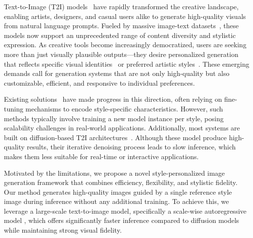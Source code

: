 \documentclass[10pt,twocolumn,letterpaper]{article}
\begin{document}
Text-to-Image (T2I) models~\cite{ramesh2021zero, rombach2022high, saharia2022photorealistic, podell2023sdxl, chang2023muse, han2025infinity, tang2024hartefficientvisualgeneration} have rapidly transformed the creative landscape, enabling artists, designers, and casual users alike to generate high-quality visuals from natural language prompts. Fueled by massive image-text datasets~\cite{changpinyo2021conceptual, lin2014microsoft, schuhmann2022laion, kakaobrain2022coyo-700m}, these models now support an unprecedented range of content diversity and stylistic expression.
As creative tools become increasingly democratized, users are seeking more than just visually plausible outputs—they desire personalized generation that reflects specific visual identities~\cite{ruiz2023dreambooth, li2023blip, wei2023elite, ryu2023low, li2024photomaker} or preferred artistic styles~\cite{sohn2023styledrop, hertz2024stylealignedimagegeneration, liu2024unziplora, ryu2023low, zhang2024finestyle}. These emerging demands call for generation systems that are not only high-quality but also customizable, efficient, and responsive to individual preferences.


Existing solutions~\cite{shah2023ziplorasubjectstyleeffectively, liu2024unziplora, ahn2024dreamstyler, frenkel2024implicitstylecontentseparationusing} have made progress in this direction, often relying on fine-tuning mechanisms to encode style-specific characteristics.
However, such methods typically involve training a new model instance per style, posing scalability challenges in real-world applications.
Additionally, most systems are built on diffusion-based T2I architectures~\cite{podell2023sdxl, saharia2022photorealistic, flux2024}. Although these model produce high-quality results, their iterative denoising process leads to slow inference, which makes them less suitable for real-time or interactive applications.

Motivated by the limitations, we propose a novel style-personalized image generation framework that combines efficiency, flexibility, and stylistic fidelity. 
Our method generates high-quality images guided by a single reference style image during inference without any additional training. 
To achieve this, we leverage a large-scale text-to-image model, specifically a scale-wise autoregressive model \cite{han2025infinity}, which offers significantly faster inference compared to diffusion models while maintaining strong visual fidelity. 
\end{document}
